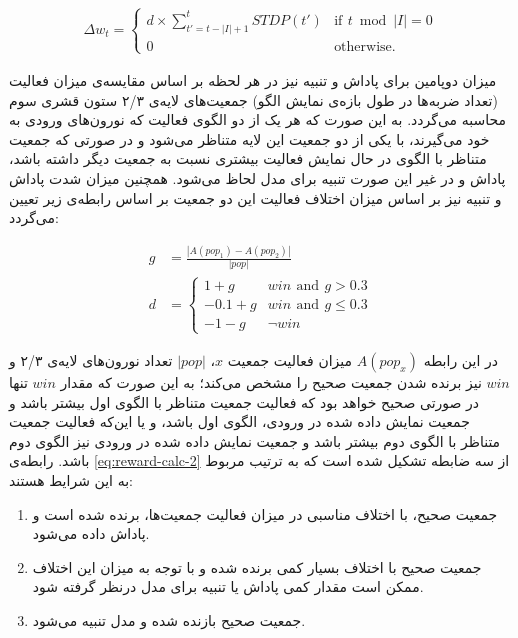 \documentclass[12pt]{report}
\begin{document}
	\begin{align}
		\Delta w_t =
		\begin{cases}
			d \times \sum_{t'=t-\left | I \right |+1}^{t} STDP(t') & \text{if}\,~t\bmod\left | I \right | = 0\\
			0 & \text{otherwise.}
		\end{cases}  
		\label{eq:seasonal}
	\end{align}
	
	میزان دوپامین برای پاداش و تنبیه نیز در هر لحظه بر اساس مقایسه‌ی میزان فعالیت (تعداد ضربه‌ها در طول بازه‌ی نمایش الگو) جمعیت‌های لایه‌ی ۲/۳ ستون قشری سوم محاسبه می‌گردد. به این صورت که هر یک از دو الگوی فعالیت که نورون‌های ورودی به خود می‌گیرند، با یکی از دو جمعیت این لایه متناظر می‌شود و در صورتی که جمعیت متناظر با الگوی در حال نمایش فعالیت بیشتری نسبت به جمعیت دیگر داشته باشد، پاداش و در غیر این صورت تنبیه برای مدل لحاظ می‌شود. همچنین میزان شدت پاداش و تنبیه نیز بر اساس میزان اختلاف فعالیت این دو جمعیت بر اساس رابطه‌ی زیر تعیین می‌گردد: 
	
	\begin{subequations}
	\begin{align}
		g &= \frac{| A(pop_1) - A(pop_2) |}{|pop|} \\ 
		d &=
		\begin{cases}
			1 + g & win \,~\text{and}~\, g > 0.3\\
			-0.1 + g & win \,~\text{and}~\, g \le 0.3\\
			-1 - g & \neg win
		\end{cases}  
		\label{eq:reward-calc-2}
	\end{align}
\end{subequations}

در این رابطه $A(pop_x)$ میزان فعالیت جمعیت $x$، $|pop|$ تعداد نورون‌های لایه‌ی ۲/۳ و $win$ نیز برنده شدن جمعیت صحیح را مشخص می‌کند؛ به این صورت که مقدار $win$ تنها در صورتی صحیح خواهد بود که فعالیت جمعیت متناظر با الگوی اول بیشتر باشد و جمعیت نمایش داده شده در ورودی، الگوی اول باشد، و یا این‌که فعالیت جمعیت متناظر با الگوی دوم بیشتر باشد و جمعیت نمایش داده شده در ورودی نیز الگوی دوم باشد. رابطه‌ی \ref{eq:reward-calc-2} از سه ضابطه تشکیل شده است که به ترتیب مربوط به این شرایط هستند:
\begin{enumerate}
	\item جمعیت صحیح، با اختلاف مناسبی در میزان فعالیت جمعیت‌ها، برنده شده است و پاداش داده می‌شود.
	\item جمعیت صحیح با اختلاف بسیار کمی برنده شده و با توجه به میزان این اختلاف ممکن است مقدار کمی پاداش یا تنبیه برای مدل درنظر گرفته شود.
	\item  جمعیت صحیح بازنده شده و مدل تنبیه می‌شود.
\end{enumerate} 
	
\end{document}
